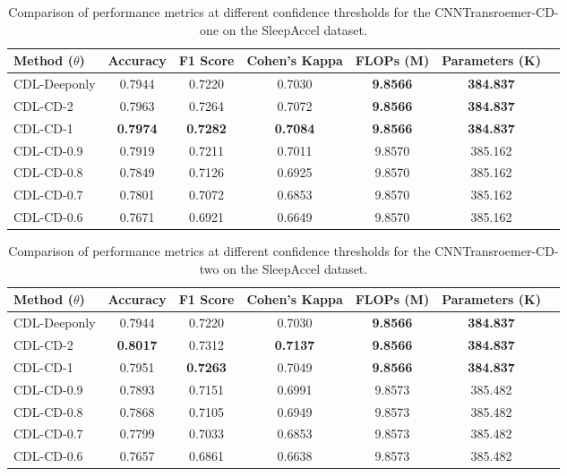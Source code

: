 \begin{table}[ht]
    \centering
    \begin{tabular}{lcccccc}
        \toprule
        Method (\(\theta\)) & Accuracy & F1 Score & Cohen's Kappa & FLOPs (M) & Parameters (K) \\
        \midrule
        CDL-Deeponly & 0.7944 & 0.7220 & 0.7030 & \textbf{9.8566} & \textbf{384.837}\\
        CDL-CD-2 & 0.7963 & 0.7264 & 0.7072 & \textbf{9.8566} & \textbf{384.837}\\
        CDL-CD-1 & \textbf{0.7974} & \textbf{0.7282} & \textbf{0.7084} & \textbf{9.8566} & \textbf{384.837}\\
        CDL-CD-0.9 & 0.7919 & 0.7211 & 0.7011 & 9.8570 & 385.162 \\
        CDL-CD-0.8 & 0.7849 & 0.7126 & 0.6925 & 9.8570 & 385.162 \\
        CDL-CD-0.7 & 0.7801 & 0.7072 & 0.6853 & 9.8570 & 385.162 \\
        CDL-CD-0.6 & 0.7671 & 0.6921 & 0.6649 & 9.8570 & 385.162 \\
        \bottomrule
    \end{tabular}
    \caption{Comparison of performance metrics at different confidence thresholds for the CNNTransroemer-CD-one on the SleepAccel dataset.}
    \label{tab:performance_of_different_confidence}
\end{table}

\begin{table}[ht]
    \centering
    \begin{tabular}{lcccccc}
        \toprule
        Method (\(\theta\)) & Accuracy & F1 Score & Cohen's Kappa & FLOPs (M) & Parameters (K) \\
        \midrule
        CDL-Deeponly & 0.7944 & 0.7220 & 0.7030 & \textbf{9.8566} & \textbf{384.837}\\
        CDL-CD-2 & \textbf{0.8017} & 0.7312 & \textbf{0.7137} & \textbf{9.8566} & \textbf{384.837}\\
        CDL-CD-1 & 0.7951 & \textbf{0.7263} & 0.7049 & \textbf{9.8566} & \textbf{384.837}\\
        CDL-CD-0.9 & 0.7893 & 0.7151 & 0.6991 & 9.8573 & 385.482 \\
        CDL-CD-0.8 & 0.7868 & 0.7105 & 0.6949 & 9.8573 & 385.482 \\
        CDL-CD-0.7 & 0.7799 & 0.7033 & 0.6853 & 9.8573 & 385.482 \\
        CDL-CD-0.6 & 0.7657 & 0.6861 & 0.6638 & 9.8573 & 385.482 \\
        \bottomrule
    \end{tabular}
    \caption{Comparison of performance metrics at different confidence thresholds for the CNNTransroemer-CD-two on the SleepAccel dataset.}
    \label{tab:performance_of_different_confidence}
\end{table}

